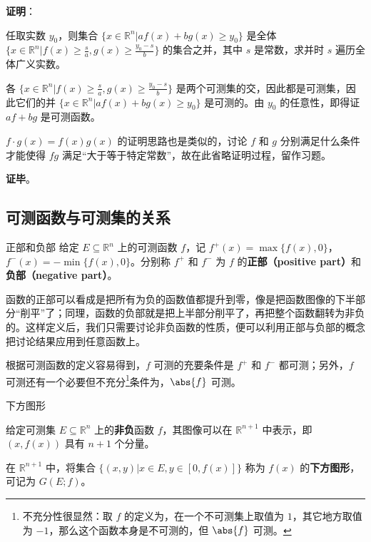 \textbf{证明}：

任取实数 $y_0$，则集合 $\{x\in\mathbb{R}^n|af(x)+bg(x)\geq y_0\}$ 是全体 $\{x\in\mathbb{R}^n|f(x)\geq \frac{s}{a}, g(x)\geq \frac{y_0-s}{b}\}$ 的集合之并，其中 $s$ 是常数，求并时 $s$ 遍历全体广义实数。

各 $\{x\in\mathbb{R}^n|f(x)\geq \frac{s}{a}, g(x)\geq \frac{y_0-s}{b}\}$ 是两个可测集的交，因此都是可测集，因此它们的并 $\{x\in\mathbb{R}^n|af(x)+bg(x)\geq y_0\}$ 是可测的。由 $y_0$ 的任意性，即得证 $af+bg$ 是可测函数。

$f\cdot g(x)=f(x)g(x)$ 的证明思路也是类似的，讨论 $f$ 和 $g$ 分别满足什么条件才能使得 $fg$ 满足“大于等于特定常数”，故在此省略证明过程，留作习题。


\textbf{证毕}。




\subsection{可测函数与可测集的关系}




\begin{definition}{正部和负部}
给定 $E\subseteq\mathbb{R}^n$ 上的可测函数 $f$，记 $f^+(x)=\max\{f(x), 0\}$，$f^-(x)=-\min\{f(x), 0\}$。分别称 $f^+$ 和 $f^-$ 为 $f$ 的\textbf{正部（positive part）}和\textbf{负部（negative part）}。
\end{definition}

函数的正部可以看成是把所有为负的函数值都提升到零，像是把函数图像的下半部分“削平”了；同理，函数的负部就是把上半部分削平了，再把整个函数翻转为非负的。这样定义后，我们只需要讨论非负函数的性质，便可以利用正部与负部的概念把讨论结果应用到任意函数上。

根据可测函数的定义容易得到，$f$ 可测的充要条件是 $f^+$ 和 $f^-$ 都可测；另外，$f$ 可测还有一个必要但不充分\footnote{不充分性很显然：取 $f$ 的定义为，在一个不可测集上取值为 $1$，其它地方取值为 $-1$，那么这个函数本身是不可测的，但 $\abs{f}$ 可测。}条件为，$\abs{f}$ 可测。

\begin{definition}{下方图形}\label{def_MsbFun_2}

给定可测集 $E\subseteq\mathbb{R}^n$ 上的\textbf{非负}函数 $f$，其图像可以在 $\mathbb{R}^{n+1}$ 中表示，即 $(x, f(x))$ 具有 $n+1$ 个分量。

在 $\mathbb{R}^{n+1}$ 中，将集合 $\{(x, y)|x\in E, y\in [0, f(x)]\}$ 称为 $f(x)$ 的\textbf{下方图形}，可记为 $G(E; f)$。

\end{definition}

